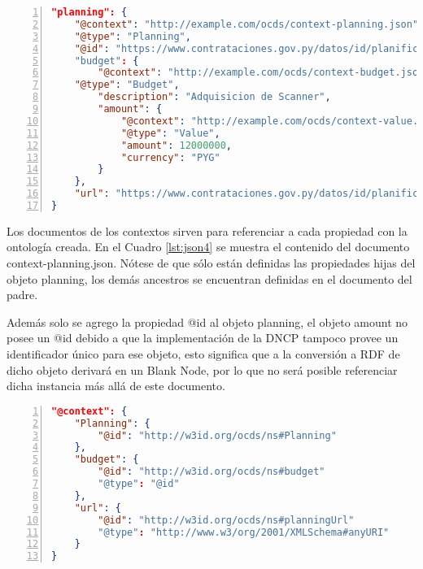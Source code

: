 \hfill \break

\noindent\begin{minipage}{\textwidth}
\begin{lstlisting}[captionpos=b, caption=Objeto JSON-LD del OCDS de un Planning, label=lst:json3,  numbers=left, language=json, firstnumber=1, numberstyle=\tiny\color{mygray},frame=single]
"planning": {
    "@context": "http://example.com/ocds/context-planning.json",
    "@type": "Planning",
    "@id": "https://www.contrataciones.gov.py/datos/id/planificaciones/193399-adquisicion-scanner"
    "budget": { 
        "@context": "http://example.com/ocds/context-budget.json",
    "@type": "Budget",
        "description": "Adquisicion de Scanner",
        "amount": {
            "@context": "http://example.com/ocds/context-value.json",
            "@type": "Value",
            "amount": 12000000,
            "currency": "PYG"
        }
    },
    "url": "https://www.contrataciones.gov.py/datos/id/planificaciones/193399-adquisicion-scanner"
}
\end{lstlisting}
\end{minipage}

Los documentos de los contextos sirven para referenciar a cada propiedad con la ontología creada. En el Cuadro \ref{lst:json4} se muestra el contenido del documento context-planning.json. Nótese de que sólo están definidas las propiedades hijas del objeto planning, los demás ancestros se encuentran definidas en el documento del padre.

Además solo se agrego la propiedad @id al objeto planning, el objeto amount no posee un @id debido a que la implementación de la DNCP tampoco provee un identificador único para ese objeto, esto significa que a la conversión a RDF de dicho objeto derivará en un Blank Node, por lo que no será posible referenciar dicha instancia más allá de este documento.

\hfill \break

\noindent\begin{minipage}{\textwidth}
\begin{lstlisting}[captionpos=b, caption=Contexto del Objeto Planning, label=lst:json4,  numbers=left, language=json, firstnumber=1, numberstyle=\tiny\color{mygray},frame=single]
"@context": {
    "Planning": {
        "@id": "http://w3id.org/ocds/ns#Planning"
    },
    "budget": {
        "@id": "http://w3id.org/ocds/ns#budget"
        "@type": "@id"
    },
    "url": {
        "@id": "http://w3id.org/ocds/ns#planningUrl"
        "@type": "http://www.w3/org/2001/XMLSchema#anyURI"
    }
}

\end{lstlisting}
\end{minipage}

